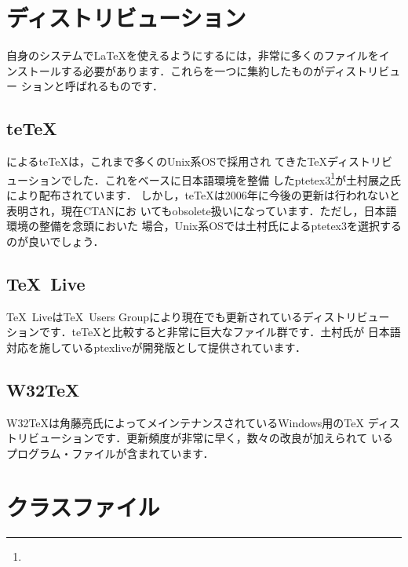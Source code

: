 \section{ディストリビューション}
自身のシステムで\LaTeX を使えるようにするには，非常に多くのファイルをイ
ンストールする必要があります．これらを一つに集約したものがディストリビュー
ションと呼ばれるものです．

\subsection{te\TeX}
によるte\TeX は，これまで多くのUnix系OSで採用され
てきた\TeX ディストリビューションでした．これをベースに日本語環境を整備
したptetex3\footnote{\webPtetex}が土村展之氏により配布されています．
しかし，te\TeX は2006年に今後の更新は行われないと表明され，現在CTANにお
いてもobsolete扱いになっています．ただし，日本語環境の整備を念頭においた
場合，Unix系OSでは土村氏によるptetex3を選択するのが良いでしょう．

\subsection{\TeX~Live}
\TeX~Liveは\TeX\ Users Groupにより現在でも更新されているディストリビュー
ションです．te\TeX と比較すると非常に巨大なファイル群です．土村氏が
日本語対応を施しているptexliveが開発版として提供されています．

\subsection{W32\TeX}
W32\TeX は角藤亮氏によってメインテナンスされているWindows用の\TeX
ディストリビューションです．更新頻度が非常に早く，数々の改良が加えられて
いるプログラム・ファイルが含まれています．

\section{クラスファイル}

